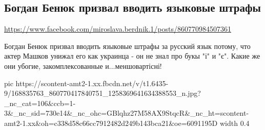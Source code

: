  
 
 
 
 

\subsection{Богдан Бенюк призвал вводить языковые штрафы}
\label{sec:04_04_2021.fb.berdnik_miroslava.1.benjuk_bogdan}
\url{https://www.facebook.com/miroslava.berdnik.1/posts/860770984507361}

Богдан Бенюк призвал вводить языковые штрафы за русский язык потому, что актер
Машков унижал его как украинца - он не знал про букы "і" и  "є".  Какие же они
убогие, закомплексованные и...меншовартісні!

\ifcmt
  pic https://scontent-amt2-1.xx.fbcdn.net/v/t1.6435-9/168835763_860770417840751_1258369641634388553_n.jpg?_nc_cat=106&ccb=1-3&_nc_sid=730e14&_nc_ohc=GBlqhz27M58AX9StqcR&_nc_ht=scontent-amt2-1.xx&oh=c338d58c66cc7912482d249b143bca21&oe=6091195D
  width 0.4
\fi

